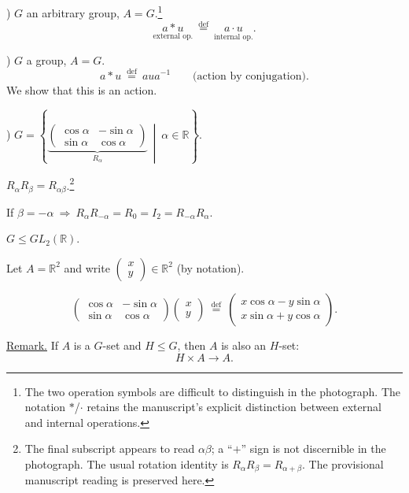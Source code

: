\bigskip
{}) $G$ an arbitrary group, $A=G$.\footnote{The two operation symbols are difficult to distinguish in the photograph. The notation $*$/$\cdot$ retains the manuscript's explicit distinction between external and internal operations.}
\[
\underset{\text{external op.}}{a*u}
\ \overset{\mathrm{def}}{=}\
\underset{\text{internal op.}}{a\cdot u}.
\]

\bigskip
{}) $G$ a group, $A=G$.
\[
a*u\ \overset{\mathrm{def}}{=}\ aua^{-1}
\qquad\text{(action by conjugation)}.
\]
\noindent We show that this is an action.

\bigskip
{}) $G=\left\{
\underbrace{\begin{pmatrix}
\cos\alpha & -\sin\alpha\\
\sin\alpha & \cos\alpha
\end{pmatrix}}_{R_\alpha}
\ \middle|\ \alpha\in\mathbb{R}\right\}$.

\noindent $R_\alpha R_\beta=R_{\alpha\beta}$.\footnote{The final subscript appears to read $\alpha\beta$; a ``$+$'' sign is not discernible in the photograph. The usual rotation identity is $R_\alpha R_\beta=R_{\alpha+\beta}$. The provisional manuscript reading is preserved here.}

\bigskip
\noindent If $\beta=-\alpha\ \Longrightarrow\
R_\alpha R_{-\alpha}=R_0=I_2=R_{-\alpha}R_\alpha$.

\bigskip
\noindent $G\leq GL_2(\mathbb{R})$.

\bigskip
\noindent Let $A=\mathbb{R}^2$ and write
$\begin{pmatrix}x\\y\end{pmatrix}\in\mathbb{R}^2$ (by notation).

\[
\begin{pmatrix}
\cos\alpha & -\sin\alpha\\
\sin\alpha & \cos\alpha
\end{pmatrix}
\begin{pmatrix}x\\y\end{pmatrix}
\ \overset{\mathrm{def}}{=}\
\begin{pmatrix}
x\cos\alpha-y\sin\alpha\\
x\sin\alpha+y\cos\alpha
\end{pmatrix}.
\]

\bigskip
\noindent\underline{Remark.} If $A$ is a $G$-set and $H\leq G$,
then $A$ is also an $H$-set:
\[
H\times A\longrightarrow A.
\]


